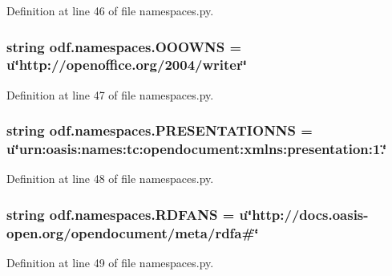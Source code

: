 Definition at line 46 of file namespaces.\+py.

\hypertarget{namespaceodf_1_1namespaces_a6391fbae7eaafe3a1a7fbb38e5001fc0}{
\subsubsection[{O\+O\+O\+W\+N\+S}]{\setlength{\rightskip}{0pt plus 5cm}string odf.\+namespaces.\+O\+O\+O\+W\+N\+S = u\char`\"{}http\+://openoffice.\+org/2004/writer\char`\"{}}}\label{namespaceodf_1_1namespaces_a6391fbae7eaafe3a1a7fbb38e5001fc0}


Definition at line 47 of file namespaces.\+py.

\hypertarget{namespaceodf_1_1namespaces_a326f5b6338cc4018c334e424882b6651}{
\subsubsection[{P\+R\+E\+S\+E\+N\+T\+A\+T\+I\+O\+N\+N\+S}]{\setlength{\rightskip}{0pt plus 5cm}string odf.\+namespaces.\+P\+R\+E\+S\+E\+N\+T\+A\+T\+I\+O\+N\+N\+S = u\char`\"{}urn\+:oasis\+:names\+:tc\+:opendocument\+:xmlns\+:presentation\+:1.\char`\"{}}}\label{namespaceodf_1_1namespaces_a326f5b6338cc4018c334e424882b6651}


Definition at line 48 of file namespaces.\+py.

\hypertarget{namespaceodf_1_1namespaces_a2277c99072ff3a05a0f867164ac05690}{
\subsubsection[{R\+D\+F\+A\+N\+S}]{\setlength{\rightskip}{0pt plus 5cm}string odf.\+namespaces.\+R\+D\+F\+A\+N\+S = u\char`\"{}http\+://docs.\+oasis-\/open.\+org/opendocument/meta/rdfa\#\char`\"{}}}\label{namespaceodf_1_1namespaces_a2277c99072ff3a05a0f867164ac05690}


Definition at line 49 of file namespaces.\+py.

